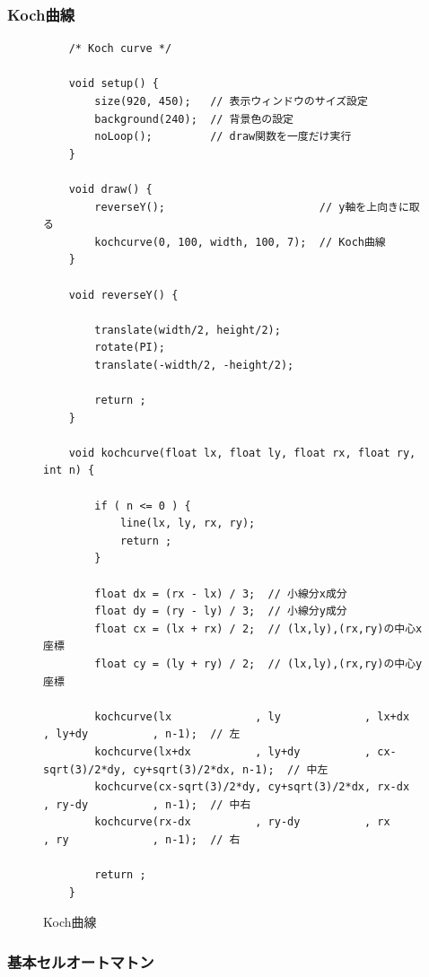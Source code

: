 \documentclass[dvipdfmx]{jsarticle}
\theoremstyle{definition}
\begin{document}
\subsubsection{Koch曲線}
\label{code_koch_curve_all}
\begin{figure}[ht]
\begin{center}
\begin{oframed}
\footnotesize
\begin{verbatim}
    /* Koch curve */

    void setup() {
        size(920, 450);   // 表示ウィンドウのサイズ設定
        background(240);  // 背景色の設定
        noLoop();         // draw関数を一度だけ実行
    }

    void draw() {
        reverseY();                        // y軸を上向きに取る
        kochcurve(0, 100, width, 100, 7);  // Koch曲線
    }

    void reverseY() {

        translate(width/2, height/2);
        rotate(PI);
        translate(-width/2, -height/2);

        return ;
    }

    void kochcurve(float lx, float ly, float rx, float ry, int n) {

        if ( n <= 0 ) {
            line(lx, ly, rx, ry);
            return ;
        }

        float dx = (rx - lx) / 3;  // 小線分x成分
        float dy = (ry - ly) / 3;  // 小線分y成分
        float cx = (lx + rx) / 2;  // (lx,ly),(rx,ry)の中心x座標
        float cy = (ly + ry) / 2;  // (lx,ly),(rx,ry)の中心y座標

        kochcurve(lx             , ly             , lx+dx          , ly+dy          , n-1);  // 左
        kochcurve(lx+dx          , ly+dy          , cx-sqrt(3)/2*dy, cy+sqrt(3)/2*dx, n-1);  // 中左
        kochcurve(cx-sqrt(3)/2*dy, cy+sqrt(3)/2*dx, rx-dx          , ry-dy          , n-1);  // 中右
        kochcurve(rx-dx          , ry-dy          , rx             , ry             , n-1);  // 右

        return ;
    }
\end{verbatim}
\end{oframed}
\end{center}
\caption{Koch曲線}
\end{figure}


\newpage{}

\subsubsection{基本セルオートマトン}
\label{code_ECA_all}
\end{document}
